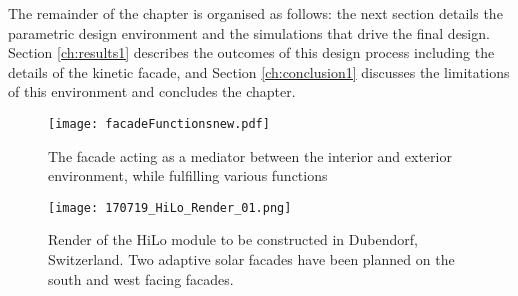 The remainder of the chapter is organised as follows: the next section details the parametric design environment and the simulations that drive the final design. Section \ref{ch:results1} describes the outcomes of this design process including the details of the kinetic facade, and Section \ref{ch:conclusion1} discusses the limitations of this environment and concludes the chapter. 



\begin{figure}
\begin{center}
\texttt{[image: facadeFunctionsnew.pdf]}
\caption{The facade acting as a mediator between the interior and exterior environment, while fulfilling various functions \cite{nagy2016adaptive}}
\label{fig:ASFschematic}
\end{center}
\end{figure}

\begin{figure}
\begin{center}
\texttt{[image: 170719\_HiLo\_Render\_01.png]}
\caption{Render of the HiLo module to be constructed in Dubendorf, Switzerland. Two adaptive solar facades have been planned on the south and west facing facades.}
\label{fig:HiLo}
\end{center}
\end{figure}





